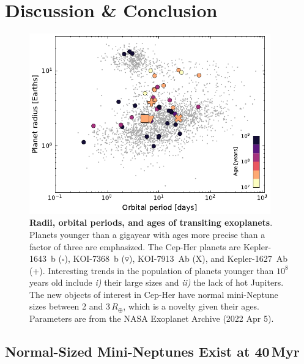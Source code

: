 \documentclass[12pt,twocolumn,tighten,linenumbers,trackchanges]{aastex63}
\begin{document}
\section{Discussion \& Conclusion}
\label{sec:disc_conc}

\begin{figure}[!t]
	\begin{center}
		\leavevmode
		\includegraphics[width=0.93\textwidth]{f4.pdf}
	\end{center}
	\vspace{-0.6cm}
	\caption{
		{\bf Radii, orbital periods, and ages of transiting exoplanets}.
    Planets younger than a gigayear with ages more precise than a
    factor of three are emphasized. The Cep-Her planets are
    Kepler-1643~b ($\square$), KOI-7368~b ($\triangledown$),
    KOI-7913~Ab (X), and Kepler-1627~Ab (+).  Interesting trends in
    the population of planets younger than $10^8$ years old include {\it i)} their
    large sizes and {\it ii)} the lack of hot Jupiters.  The new
    objects of interest in Cep-Her have normal mini-Neptune sizes
    between 2 and 3\,$R_\oplus$, which is a novelty given their ages.
    Parameters are from the NASA Exoplanet Archive (2022 Apr 5).
		\label{fig:rp_period_age}
	}
\end{figure}


\subsection{Normal-Sized Mini-Neptunes Exist at 40$\,$Myr}
\label{subsec:sizes}
\end{document}
